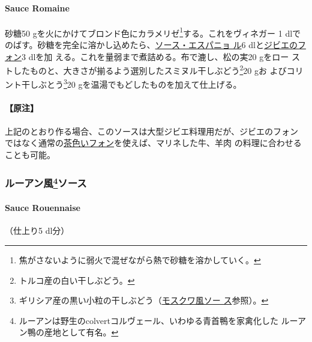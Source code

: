 \begin{recette}
\hypertarget{sauce-romaine}{%
\paragraph{Sauce Romaine}\label{sauce-romaine}}

砂糖50 gを火にかけてブロンド色にカラメリゼ\footnote{焦がさないように弱火で混ぜながら熱で砂糖を溶かしていく。}する。これをヴィネガー
1\undemi{}
dlでのばす。砂糖を完全に溶かし込めたら、\protect\hyperlink{sauce-espagnole}{ソース・エスパニョ
ル}6 dlと\protect\hyperlink{fonds-de-gibier}{ジビエのフォン}3 dlを加
える。これを\troisquarts{}量弱まで煮詰める。布で漉し、松の実20 gをロー
ストしたものと、大きさが揃るよう選別したスミヌル干しぶどう\footnote{トルコ産の白い干しぶどう。}20
gお よびコリント干しぶとう\footnote{ギリシア産の黒い小粒の干しぶどう（\protect\hyperlink{sauce-moscovite}{モスクワ風ソー
  ス}参照）。}20 gを温湯でもどしたものを加えて仕上げる。

\hypertarget{ux539fux6ce8-8}{%
\paragraph{【原注】}\label{ux539fux6ce8-8}}

上記のとおり作る場合、このソースは大型ジビエ料理用だが、ジビエのフォン
ではなく通常の\protect\hyperlink{fonds-brun}{茶色いフォン}を使えば、マリネした牛、羊肉
の料理に合わせることも可能。

\maeaki

\hypertarget{ux30ebux30fcux30a2ux30f3ux98a884ux30bdux30fcux30b9}{%
\subsubsection[ルーアン風ソース]{\texorpdfstring{ルーアン風\footnote{ルーアンは野生のcolvertコルヴェール、いわゆる青首鴨を家禽化した
  ルーアン鴨の産地として有名。}ソース}{ルーアン風ソース}}\label{ux30ebux30fcux30a2ux30f3ux98a884ux30bdux30fcux30b9}}

\hypertarget{sauce-rouennaise}{%
\paragraph{Sauce Rouennaise}\label{sauce-rouennaise}}

   

（仕上り5 dl分）


\end{recette}
